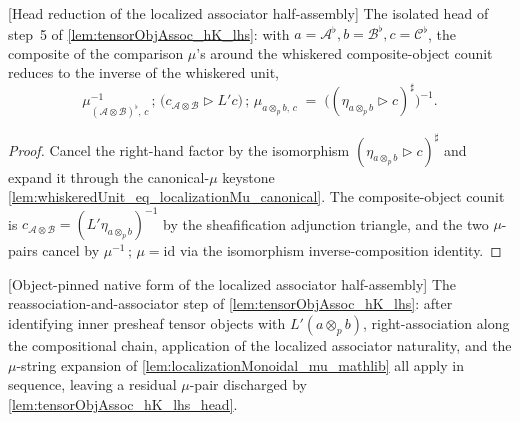 \begin{lemma}



[Head reduction of the localized associator half-assembly]
  \label{lem:tensorObjAssoc_hK_lhs_head}
  The isolated head of step~5 of \cref{lem:tensorObjAssoc_hK_lhs}: with
  \(a=\mathcal{A}^{\flat}, b=\mathcal{B}^{\flat}, c=\mathcal{C}^{\flat}\), the composite of the
  comparison \(\mu\)'s around the whiskered composite-object counit reduces to the inverse of the
  whiskered unit,
  \[
    \mu_{(\mathcal{A}\otimes\mathcal{B})^{\flat},\,c}^{-1}\,;\,
      \bigl(c_{\mathcal{A}\otimes\mathcal{B}} \rhd L'c\bigr)\,;\,
      \mu_{a\otimes_p b,\,c}
    \;=\; \bigl((\eta_{a\otimes_p b} \rhd c)^{\sharp}\bigr)^{-1}.
  \]
\end{lemma}

\begin{proof}
  Cancel the right-hand factor by the isomorphism \((\eta_{a\otimes_p b}\rhd c)^{\sharp}\) and expand it through
  the canonical-\(\mu\) keystone \cref{lem:whiskeredUnit_eq_localizationMu_canonical}. The composite-object
  counit is \(c_{\mathcal{A}\otimes\mathcal{B}} = (L'\eta_{a\otimes_p b})^{-1}\) by the sheafification
  adjunction triangle, and the two \(\mu\)-pairs cancel by \(\mu^{-1}\,;\,\mu = \mathrm{id}\) via
  the isomorphism inverse-composition identity.
\end{proof}

\begin{lemma}



[Object-pinned native form of the localized associator half-assembly]
  \label{lem:tensorObjAssoc_hK_lhs_native}
  The reassociation-and-associator step of \cref{lem:tensorObjAssoc_hK_lhs}: after
  identifying inner presheaf tensor objects with \(L'(a \otimes_p b)\), right-association along
  the compositional chain, application of the localized associator naturality, and the
  \(\mu\)-string expansion of \cref{lem:localizationMonoidal_mu_mathlib} all apply in sequence,
  leaving a residual \(\mu\)-pair discharged by \cref{lem:tensorObjAssoc_hK_lhs_head}.
\end{lemma}

